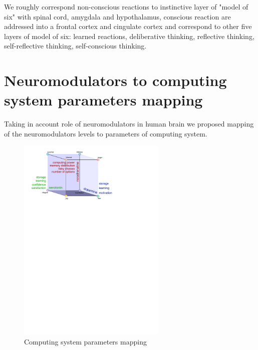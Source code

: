 We roughly correspond non-conscious reactions to instinctive layer of "model of six" \cite{emotionmachine} with spinal cord, amygdala and hypothalamus, conscious reaction are addressed into a frontal cortex and cingulate cortex and correspond to other five layers of model of six: learned reactions, deliberative thinking, reflective thinking, self-reflective thinking, self-conscious thinking.

\section{Neuromodulators to computing system parameters mapping}

Taking in account role of neuromodulators in human brain \cite{cubeofemotions, emotionsbraintorobot, neuromodulatory} we proposed mapping of the neuromodulators levels to parameters of computing system.

\begin{figure}
\begin{center}
 \includegraphics[height=10cm]{figure3_cube_of_parameters}
\end{center}
\caption{Computing system parameters mapping}
\label{figure3_cube_of_parameters}
\end{figure}


